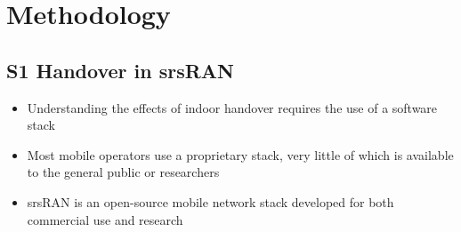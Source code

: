 \chapter{Methodology}
\section{S1 Handover in srsRAN}
\begin{itemize}
    \item Understanding the effects of indoor handover requires the use of a software stack
    \item Most mobile operators use a proprietary stack, very little of which is available to the general public or researchers
    \item srsRAN is an open-source mobile network stack developed for both commercial use and research

\end{itemize}
